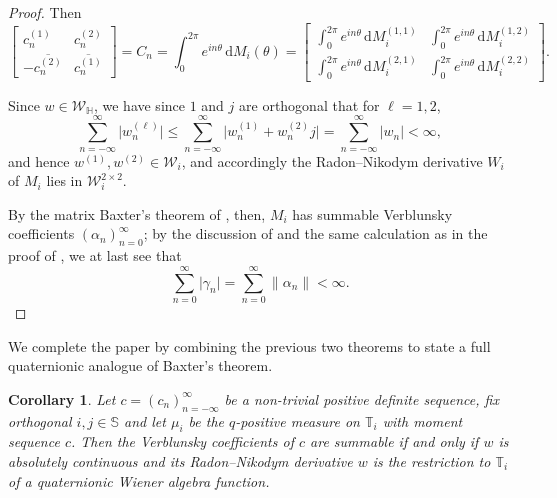 \documentclass[11pt,reqno]{amsart}
\def\a{\alpha}
\def\g{\gamma}
\def\th{\theta}
\def\rmd{\mathrm{d}}
\def\SS{\mathbb{S}}
\def\TT{\mathbb{T}}
\def\HH{\mathbb{H}}
\newtheorem{corollary}[theorem]{Corollary}
\theoremstyle{definition}
\numberwithin{equation}{section}
\begin{document}
\begin{proof}
    Then
    \[
        \begin{bmatrix} c_n^{(1)} & c_n^{(2)} \\[6pt] -\overline{c_n^{(2)}} & \overline{c_n^{(1)}}\end{bmatrix} = C_n = \int_0^{2\pi} e^{in\th} \, \rmd M_i(\th) = \begin{bmatrix} \int_0^{2\pi} e^{in\th} \, \rmd M_i^{(1,1)} & \int_0^{2\pi} e^{in\th} \, \rmd M_i^{(1,2)} \\[6pt] \int_0^{2\pi} e^{in\th} \, \rmd M_i^{(2,1)} & \int_0^{2\pi} e^{in\th} \, \rmd M_i^{(2,2)} \end{bmatrix}.
    \]
    
    Since \(w \in \mathscr{W}_\HH\), we have since \(1\) and \(j\) are orthogonal that for \(\ell = 1,2\),
	\[
		\sum_{n=-\infty}^{\infty} \lvert w_n^{(\ell)} \rvert \leq \sum_{n=-\infty}^{\infty} \lvert w_n^{(1)} + w_n^{(2)}j \rvert = \sum_{n=-\infty}^{\infty} \lvert w_n \rvert < \infty,
	\]
	and hence \(w^{(1)}, w^{(2)} \in \mathscr{W}_i\), and accordingly the Radon--Nikodym derivative \(W_i\) of \(M_i\) lies in \(\mathscr{W}_i^{2\times2}\).

	By the matrix Baxter's theorem of \cite{DK16}, then, \(M_i\) has summable Verblunsky coefficients \((\a_n)_{n=0}^{\infty}\); by the discussion of  and the same calculation as in the proof of , we at last see that
	\[
		\sum_{n=0}^{\infty} \lvert \g_n \rvert = \sum_{n=0}^{\infty} \lVert\a_n\rVert < \infty.
	\]
\end{proof}

We complete the paper by combining the previous two theorems to state a full quaternionic analogue of Baxter's theorem.

\begin{corollary}
\label{cor:QuaternionicBaxter}
    Let \(c = (c_n)_{n=-\infty}^{\infty}\) be a non-trivial positive definite sequence, fix orthogonal \(i,j \in \SS\) and let \(\mu_i\) be the \(q\)-positive measure on \(\TT_i\) with moment sequence \(c\). Then the Verblunsky coefficients of \(c\) are summable if and only if \(w\) is absolutely continuous and its Radon--Nikodym derivative \(w\) is the restriction to \(\TT_i\) of a quaternionic Wiener algebra function.
\end{corollary}
\end{document}
